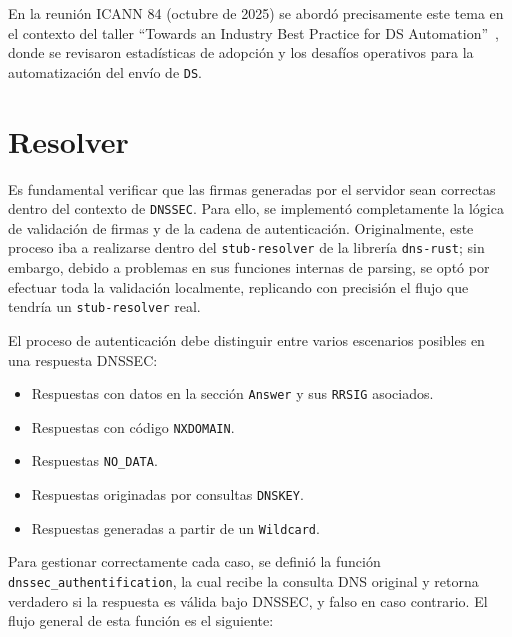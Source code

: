 En la reunión ICANN 84 (octubre de 2025) se abordó precisamente este tema en el contexto del taller  “Towards an Industry Best Practice for DS Automation”~\cite{ICANN84},
donde se revisaron estadísticas de adopción y los desafíos operativos para la automatización del envío de \texttt{DS}.

\section{Resolver}

Es fundamental verificar que las firmas generadas por el servidor sean correctas dentro del contexto de \texttt{DNSSEC}. Para ello, se implementó completamente la lógica de validación de firmas y 
de la cadena de autenticación. Originalmente, este proceso iba a realizarse dentro del \texttt{stub-resolver} de la librería \texttt{dns-rust}; sin embargo, debido a problemas en sus funciones 
internas de parsing, se optó por efectuar toda la validación localmente, replicando con precisión el flujo que tendría un \texttt{stub-resolver} real.

El proceso de autenticación debe distinguir entre varios escenarios posibles en una respuesta DNSSEC:

\begin{itemize}
\item Respuestas con datos en la sección \texttt{Answer} y sus \texttt{RRSIG} asociados.
\item Respuestas con código \texttt{NXDOMAIN}.
\item Respuestas \texttt{NO\_DATA}.
\item Respuestas originadas por consultas \texttt{DNSKEY}.
\item Respuestas generadas a partir de un \texttt{Wildcard}.
\end{itemize}

Para gestionar correctamente cada caso, se definió la función \texttt{dnssec\_authentification}, la cual recibe la consulta DNS original y retorna verdadero si la respuesta es válida bajo DNSSEC, 
y falso en caso contrario. El flujo general de esta función es el siguiente:


